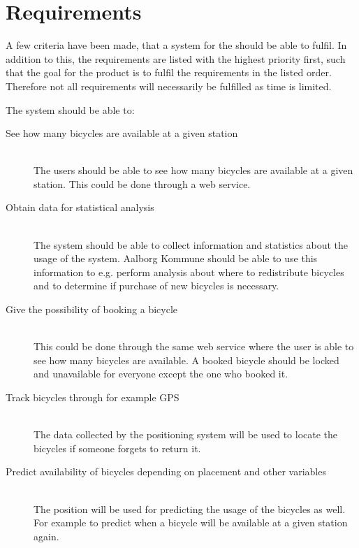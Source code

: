 \section{Requirements}
A few criteria have been made, that a system for the \bycykel should be able to fulfil. 
In addition to this, the requirements are listed with the highest priority first, such that the goal for the product is to fulfil the requirements in the listed order. 
Therefore not all requirements will necessarily be fulfilled as time is limited.

The system should be able to:
\begin{description}
\item[See how many bicycles are available at a given station] \hfill \\
The users should be able to see how many bicycles are available at a given station.
This could be done through a web service.
\item[Obtain data for statistical analysis] \hfill \\
The system should be able to collect information and statistics about the usage of the system.
Aalborg Kommune should be able to use this information to e.g. perform analysis about where to redistribute bicycles and to determine if purchase of new bicycles is necessary.
\item[Give the possibility of booking a bicycle] \hfill \\
This could be done through the same web service where the user is able to see how many bicycles are available.
A booked bicycle should be locked and unavailable for everyone except the one who booked it.
\item[Track bicycles through for example GPS] \hfill \\
The data collected by the positioning system will be used to locate the bicycles if someone forgets to return it.
\item[Predict availability of bicycles depending on placement and other variables] \hfill \\
The position will be used for predicting the usage of the bicycles as well. 
For example to predict when a bicycle will be available at a given station again.
\end{description}